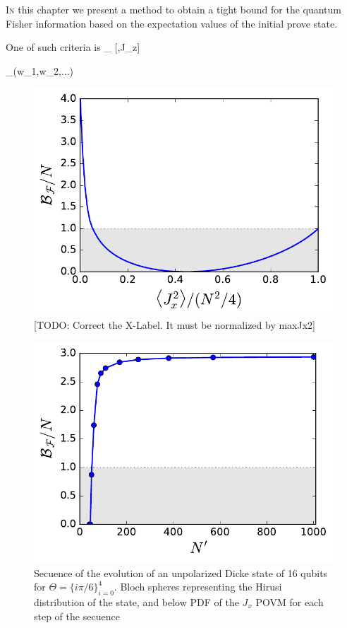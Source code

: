 \lettrine[lines=2, findent=3pt,nindent=0pt]{I}{n} this chapter we present a method to obtain a tight bound for the quantum Fisher information based on the expectation values of the initial prove state.

One of such criteria is
\be
  _{} [\rho,J_z] \geq {}
\ee

\be
  _{}(w_1,w_2,...)
\ee

\begin{figure}
  \centering
  \includegraphics[scale=.65]{img/plots/LT_dicke_edge.pdf}
  \caption{[TODO: Correct the X-Label. It must be normalized by maxJx2]}
  \label{fig:vd-secuence-evo}
\end{figure}

\begin{figure}
  \centering
  \includegraphics[scale=.65]{img/plots/LT_dicke_7900_asymp.pdf}
  \caption{Secuence of the evolution of an unpolarized Dicke state of 16 qubits for $\Theta=\{i\pi/6\}_{i=0}^4$. Bloch spheres representing the Hirusi distribution of the state, and below PDF of the $J_x$ POVM for each step of the secuence}
  \label{fig:vd-secuence-evo}
\end{figure}
